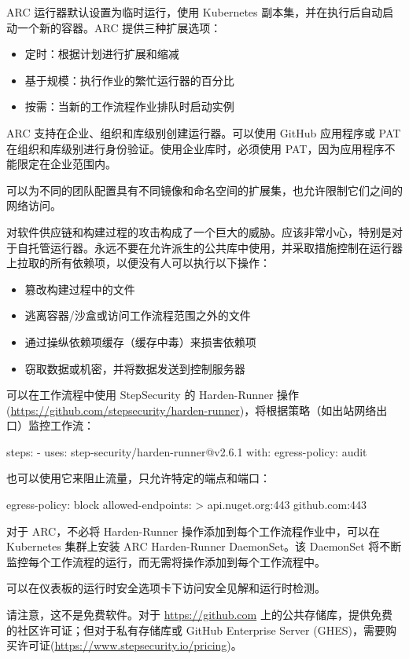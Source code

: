 
ARC 运行器默认设置为临时运行，使用 Kubernetes 副本集，并在执行后自动启动一个新的容器。ARC 提供三种扩展选项：

\begin{itemize}
\item 
定时：根据计划进行扩展和缩减

\item 
基于规模：执行作业的繁忙运行器的百分比

\item 
按需：当新的工作流程作业排队时启动实例
\end{itemize}

ARC 支持在企业、组织和库级别创建运行器。可以使用 GitHub 应用程序或 PAT 在组织和库级别进行身份验证。使用企业库时，必须使用 PAT，因为应用程序不能限定在企业范围内。

可以为不同的团队配置具有不同镜像和命名空间的扩展集，也允许限制它们之间的网络访问。


对软件供应链和构建过程的攻击构成了一个巨大的威胁。应该非常小心，特别是对于自托管运行器。永远不要在允许派生的公共库中使用，并采取措施控制在运行器上拉取的所有依赖项，以便没有人可以执行以下操作：

\begin{itemize}
\item 
篡改构建过程中的文件

\item 
逃离容器/沙盒或访问工作流程范围之外的文件

\item 
通过操纵依赖项缓存（缓存中毒）来损害依赖项

\item 
窃取数据或机密，并将数据发送到控制服务器
\end{itemize}

可以在工作流程中使用 StepSecurity 的 Harden-Runner 操作(\url{https://github.com/stepsecurity/harden-runner})，将根据策略（如出站网络出口）监控工作流：

\begin{shell}
steps:
  - uses: step-security/harden-runner@v2.6.1
    with:
      egress-policy: audit
\end{shell}

也可以使用它来阻止流量，只允许特定的端点和端口：

\begin{shell}
egress-policy: block
allowed-endpoints: >
  api.nuget.org:443
  github.com:443
\end{shell}

对于 ARC，不必将 Harden-Runner 操作添加到每个工作流程作业中，可以在 Kubernetes 集群上安装 ARC Harden-Runner DaemonSet。该 DaemonSet 将不断监控每个工作流程的运行，而无需将操作添加到每个工作流程中。

可以在仪表板的运行时安全选项卡下访问安全见解和运行时检测。

请注意，这不是免费软件。对于 \url{https://github.com} 上的公共存储库，提供免费的社区许可证；但对于私有存储库或 GitHub Enterprise Server (GHES)，需要购买许可证(\url{https://www.stepsecurity.io/pricing})。



